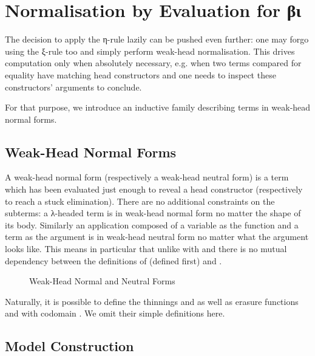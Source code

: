 
\section{Normalisation by Evaluation for βι}

The decision to apply the η-rule lazily can be pushed even further: one may
forgo using the ξ-rule too and simply perform weak-head normalisation. This
drives computation only when absolutely necessary, e.g.
when two terms compared for equality have matching head constructors
and one needs to inspect these constructors' arguments to conclude.

For that purpose, we introduce an inductive family describing terms in weak-head
normal forms.

\subsection{Weak-Head Normal Forms}

A weak-head normal form (respectively a weak-head neutral form) is a term which has
been evaluated just enough to reveal a head constructor (respectively to reach a
stuck elimination). There are no additional constraints on the subterms: a λ-headed
term is in weak-head normal form no matter the shape of its body. Similarly an
application composed of a variable as the function and a term as the argument is in
weak-head neutral form no matter what the argument looks like. This means in particular
that unlike with  and  there is no mutual dependency between the definitions
of  (defined first) and .

\begin{figure}[h]
\caption{Weak-Head Normal and Neutral Forms\label{fig:weakhead}}
\end{figure}

Naturally, it is possible to define the thinnings
 and  as well as erasure
functions  and 
with codomain . We omit their simple definitions here.

\subsection{Model Construction}

